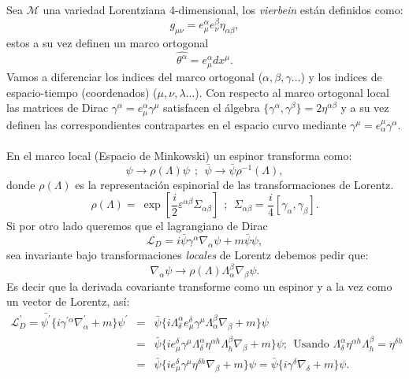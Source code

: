 Sea $\mathcal{M}$ una variedad Lorentziana 4-dimensional, los \textit{vierbein} están definidos como: 
\begin{equation}
g_{\mu\nu}=e_{\mu}^{\alpha}e_{\nu}^{\beta}\eta_{\alpha\beta} ,
\end{equation}
estos a su vez definen un marco ortogonal
\begin{equation}
\hat{\theta^{\alpha}}=e_{\mu}^{\alpha}dx^{\mu} .
\end{equation}
Vamos a diferenciar los indices del marco ortogonal ($\alpha ,\beta ,\gamma ...$) y los indices de espacio-tiempo (coordenados) ($\mu ,\nu ,\lambda ...$). Con respecto al marco ortogonal local las matrices de Dirac $\gamma^\alpha=e^{\alpha}_{\mu}\gamma^\mu$ satisfacen el álgebra $\{\gamma^{\alpha},\gamma^{\beta}\}=2\eta^{\alpha\beta}$ y a su vez definen las correspondientes contrapartes en el espacio curvo mediante $\gamma^{\mu}=e_{\alpha}^{\mu}\gamma^{\alpha}$.
\\
\\
En el marco local (Espacio de Minkowski) un espinor transforma como:
\begin{equation}
\psi\to\rho(\Lambda)\psi \ \ ;\ \ \bar{\psi}\to\bar{\psi}\rho^{-1}(\Lambda),
\end{equation}
donde $\rho(\Lambda)$ es la representación espinorial de las transformaciones de Lorentz.
\begin{equation}
\rho(\Lambda)=\ \exp\left[\frac{i}{2}\varepsilon^{\alpha\beta}\Sigma_{\alpha\beta}\right]\ \ ;\ \ \Sigma_{\alpha\beta}=\frac{i}{4}[\gamma_{\alpha},\gamma_{\beta}] .
\end{equation}
Si por otro lado queremos que el lagrangiano de Dirac
\begin{equation}
\mathcal{L}_D=i\bar{\psi}\gamma^{\alpha}\nabla_{\alpha}\psi+m\bar{\psi}\psi ,
\end{equation}
sea invariante bajo transformaciones \textit{locales} de Lorentz debemos pedir que:
\begin{equation}
\nabla_{\alpha}\psi\to\rho(\Lambda)\Lambda_{\alpha}^{\beta}\nabla_{\beta}\psi .
\end{equation}
Es decir que la derivada covariante transforme como un espinor y a la vez como un vector de Lorentz, así:
\begin{eqnarray}
\nonumber \mathcal{L}_{D}^{\prime}=\bar{\psi^{\prime}}\{i\gamma^{\prime\alpha}\nabla_{\alpha}^{\prime}+m\}\psi^{\prime}&=& 	\bar{\psi}\{i\Lambda_{\delta}^{\alpha}e_{\mu}^{\delta}\gamma^{\mu}\Lambda_{\alpha}^{\beta}\nabla_{\beta}+m\}\psi\\
\nonumber &=& \bar{\psi}\{ie_{\mu}^{\delta}\gamma^{\mu}\Lambda_{\delta}^{\alpha}\eta^{\alpha h}\Lambda_{h}^{\beta}\nabla_{\beta}+m\}\psi;\ \ \text{Usando }\Lambda_{\delta}^{\alpha}\eta^{\alpha h}\Lambda_{h}^{\beta}=\eta^{\delta h}\\
&=& \bar{\psi}\{ie_{\mu}^{\delta}\gamma^{\mu}\eta^{\delta h}\nabla_{\beta}+m\}\psi=\bar{\psi}\{i\gamma^{\delta}\nabla_{\delta}+m\}\psi .
\end{eqnarray}
